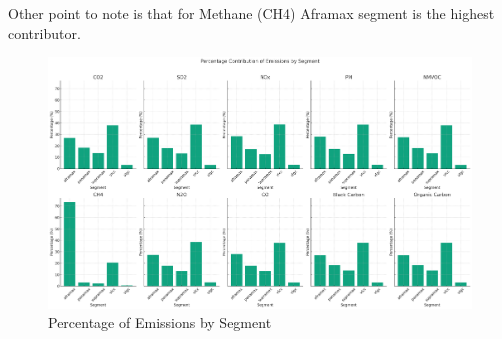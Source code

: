 Other point to note is that for Methane (CH4) Aframax segment is the highest contributor. 

\newpage
\begin{figure}[ht]
    \centering
    \includegraphics[width=1\textwidth]{images/segment_emissions.png}
    \caption{Percentage of Emissions by Segment}
    \label{segment_emissions}
\end{figure}